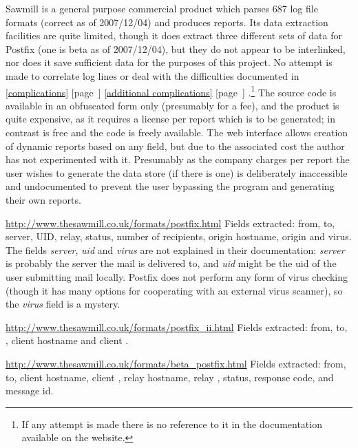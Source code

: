 \documentclass[a4paper,12pt,draft]{article}
\newcommand{\parsername}{\PLP{}}
\newcommand{\refwithpage}[1]{%
    \empty{}\ref{#1} [page~\pageref{#1}]%
}
\newcommand{\sectionref}[1]{%
    \textsection{}\refwithpage{#1}%
}
\begin{document}
\begin{description}
        Sawmill is a general purpose commercial product which parses 687
        log file formats (correct as of 2007/12/04) and produces reports.
        Its data extraction facilities are quite limited, though it does
        extract three different sets of data for Postfix (one is beta as of
        2007/12/04), but they do not appear to be interlinked, nor does it
        save sufficient data for the purposes of this project.  No attempt
        is made to correlate log lines or deal with the difficulties
        documented in \sectionref{complications} \sectionref{additional
        complications}.\footnote{If any attempt is made there is no
        reference to it in the documentation available on the website.} The
        source code is available in an obfuscated form only (presumably for
        a fee), and the product is quite expensive, as it requires a
        license per report which is to be generated; in contrast
        \parsername{} is free and the code is freely available.  The web
        interface allows creation of dynamic reports based on any field,
        but due to the associated cost the author has not experimented with
        it.  Presumably as the company charges per report the user wishes
        to generate the data store (if there is one) is deliberately
        inaccessible and undocumented to prevent the user bypassing the
        program and generating their own reports.

        \url{http://www.thesawmill.co.uk/formats/postfix.html} \newline
        Fields extracted: from, to, server, UID, relay, status, number of
        recipients, origin hostname, origin \IP{} and virus.  The fields
        \textit{server}, \textit{uid\/} and \textit{virus\/} are not
        explained in their documentation: \textit{server\/} is probably the
        server the mail is delivered to, and \textit{uid\/} might be the
        uid of the user submitting mail locally.  Postfix does not perform
        any form of virus checking (though it has many options for
        cooperating with an external virus scanner), so the
        \textit{virus\/} field is a mystery.

        \url{http://www.thesawmill.co.uk/formats/postfix_ii.html} \newline
        Fields extracted: from, to, \RBL{}, client hostname and client
        \IP{}\@.

        \url{http://www.thesawmill.co.uk/formats/beta_postfix.html}
        \newline Fields extracted: from, to, client hostname, client \IP{},
        relay hostname, relay \IP{}, status, response code, \RBL{} and
        message id.


\end{description}
\end{document}
